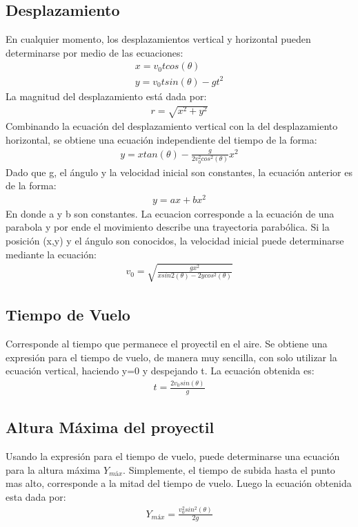 \documentclass[12pt,a4paper]{article}
\begin{document}
\subsection{Desplazamiento}
En cualquier momento, los desplazamientos vertical y horizontal pueden determinarse por medio de las ecuaciones:
\begin{eqnarray}
x=v_{0}tcos(\theta)\nonumber\\
y=v_{0}tsin(\theta)-gt^{2}
\end{eqnarray}
La magnitud del desplazamiento está dada por:
\begin{eqnarray}
r=\sqrt{x^{2}+y^{2}}
\end{eqnarray}
Combinando la ecuación del desplazamiento vertical con la del desplazamiento horizontal, se obtiene una ecuación independiente del tiempo de la forma:
\begin{eqnarray}
y=xtan(\theta)-\frac{g}{2v_{0}^{2}cos^{2}(\theta)}x^{2}
\end{eqnarray}
Dado que g, el ángulo y la velocidad inicial son constantes, la ecuación anterior es de la forma:
\begin{eqnarray}
y=ax+bx^{2}
\end{eqnarray}
En donde a y b son constantes. La ecuacion corresponde a la ecuación de una parabola y por ende el movimiento describe una trayectoria parabólica. Si la posición (x,y) y el ángulo  son conocidos, la velocidad inicial puede determinarse mediante la ecuación:
\begin{eqnarray}
v_{0}=\sqrt{\frac{gx^{2}}{xsin2(\theta)-2ycos^{2}(\theta)}}
\end{eqnarray}
\subsection{Tiempo de Vuelo}
Corresponde al tiempo que permanece el proyectil en el aire. Se obtiene una expresión para el tiempo de vuelo, de manera muy sencilla, con solo utilizar la ecuación vertical, haciendo y=0 y despejando t. La ecuación obtenida es:
\begin{eqnarray}
t=\frac{2v_{0}sin(\theta)}{g}
\end{eqnarray}
\subsection{Altura Máxima del proyectil}
Usando la expresión para el tiempo de vuelo, puede determinarse una ecuación para la altura máxima $Y_{máx}$. Simplemente, el tiempo de subida hasta el punto mas alto, corresponde a la mitad del tiempo de vuelo. Luego la ecuación obtenida esta dada por:
\begin{eqnarray}
Y_{máx}=\frac{v^{2}_{0}sin^{2}(\theta)}{2g} 
\end{eqnarray}
\end{document}
